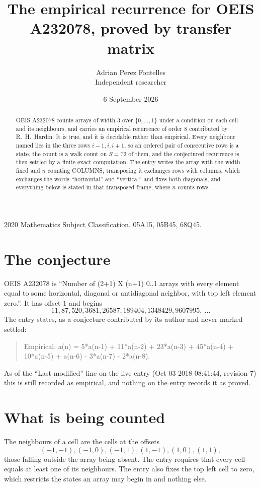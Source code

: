 \documentclass[11pt,a4paper]{article}
\title{The empirical recurrence for OEIS A232078, proved by transfer matrix}
\author{Adrian Perez Fontelles\\ \small Independent researcher}
\date{6 September 2026}
\theoremstyle{plain}
\theoremstyle{definition}
\begin{document}
\maketitle

\begin{abstract}
OEIS A232078 counts arrays of width $3$ over $\{0,\dots,1\}$ under a condition on each cell
and its neighbours, and carries an empirical recurrence of order $8$ contributed by
R.~H.~Hardin. It is true, and it is decidable rather than empirical. Every neighbour named lies
in the three rows $i-1,i,i+1$, so an ordered pair of consecutive rows is a state, the count is
a walk count on $S=72$ of them, and the conjectured recurrence is then settled by a finite
exact computation. The entry writes the array with the width fixed and $n$ counting
COLUMNS; transposing it exchanges rows with columns, which exchanges the words ``horizontal''
and ``vertical'' and fixes both diagonals, and everything below is stated in that transposed
frame, where $n$ counts rows.
\end{abstract}

\noindent\small 2020 Mathematics Subject Classification. 05A15, 05B45, 68Q45.\normalsize

\section{The conjecture}

OEIS A232078 is ``Number of (2+1) X (n+1) 0..1 arrays with every element equal to some horizontal, diagonal or antidiagonal neighbor, with top left element zero.''. It has offset $1$ and begins
\[
11, 87, 520, 3681, 26587, 189404, 1348429, 9607995,\ \dots
\]
The entry states, as a conjecture contributed by its author and never marked settled:
\begin{quote}
Empirical: a(n) = 5*a(n-1) + 11*a(n-2) + 23*a(n-3) + 45*a(n-4) + 10*a(n-5) + a(n-6) - 3*a(n-7) - 2*a(n-8).
\end{quote}
As of the ``Last modified'' line on the live entry (Oct 03 2018 08:41:44, revision 7) this is still
recorded as empirical, and nothing on the entry records it as proved.

\section{What is being counted}

The neighbours of a cell are the cells at the offsets
\[
(-1,-1), (-1,0), (-1,1), (1,-1), (1,0), (1,1),
\]
those falling outside the array being absent. The entry requires that every cell equals at least one of its neighbours. The entry also fixes the top left cell to zero, which restricts the states an array may begin in and nothing else.
\end{document}

